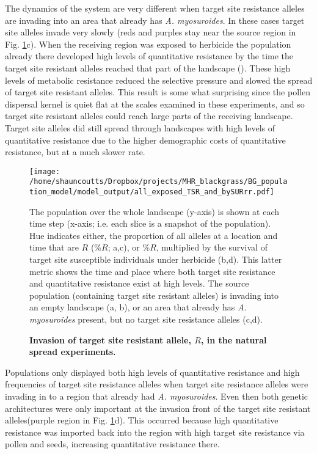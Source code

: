 \documentclass[10pt,letterpaper]{article}
\begin{document}
The dynamics of the system are very different when target site resistance alleles are invading into an area that already has \textit{A. myosuroides}. In these cases target site alleles invade very slowly (reds and purples stay near the source region in Fig. \ref{fig:pro_R_natspr}c). When the receiving region was exposed to herbicide the population already there developed high levels of quantitative resistance by the time the target site resistant alleles reached that part of the landscape (). These high levels of metabolic resistance reduced the selective pressure and slowed the spread of target site resistant alleles. This result is some what surprising since the pollen dispersal kernel is quiet flat at the scales examined in these experiments, and so target site resistant alleles could reach large parts of the receiving landscape. Target site alleles did still spread through landscapes with high levels of quantitative resistance due to the higher demographic costs of quantitative resistance, but at a much slower rate.    


\begin{figure}[!h] 
	\texttt{[image: /home/shauncoutts/Dropbox/projects/MHR\_blackgrass/BG\_population\_model/model\_output/all\_exposed\_TSR\_and\_bySURrr.pdf]}
\caption{\bf Invasion of target site resistant allele, $R$, in the natural spread experiments.} The population over the whole landscape (y-axis) is shown at each time step (x-axis; i.e. each slice is a snapshot of the population). Hue indicates either, the proportion of all alleles at a location and time that are $R$ (\%$R$; a,c), or \%$R$, multiplied by the survival of target site susceptible individuals under herbicide (b,d). This latter metric shows the time and place where both target site resistance and quantitative resistance exist at high levels. The source population (containing target site resistant alleles) is invading into an empty landscape (a, b), or an area that already has \textit{A. myosuroides} present, but no target site resistance alleles (c,d). 
\label{fig:pro_R_natspr}
\end{figure}

Populations only displayed both high levels of quantitative resistance and high frequencies of target site resistance alleles when target site resistance alleles were invading in to a region that already had \textit{A. myosuroides}. Even then both genetic architectures were only important at the invasion front of the target site resistant alleles(purple region in Fig. \ref{fig:pro_R_natspr}d). This occurred because high quantitative resistance was imported back into the region with high target site resistance via pollen and seeds, increasing quantitative resistance there.        
\end{document}
